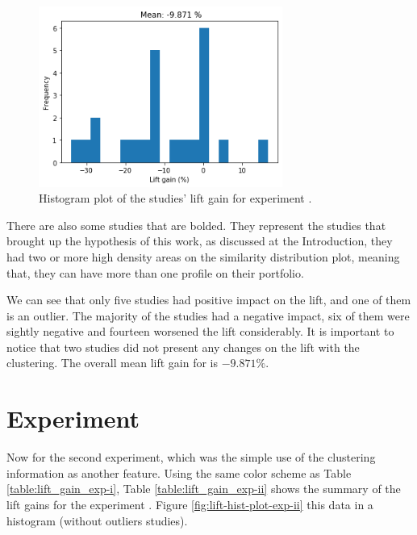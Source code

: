 \begin{figure}[!ht]
   \centering
   \includegraphics[width=8cm]{fig/ch4-lift-hist-plot-exp-i.png}
   \caption{Histogram plot of the studies' lift gain for experiment \nameExperimentI{}.}
   \label{fig:lift-hist-plot-exp-i}
\end{figure}

There are also some studies that are bolded. They represent the studies that brought up the hypothesis of this work, as discussed at the Introduction, they had two or more high density areas on the similarity distribution plot, meaning that, they can have more than one profile on their portfolio.

We can see that only five studies had positive impact on the lift, and one of them is an outlier. The majority of the studies had a negative impact, six of them were sightly negative and fourteen worsened the lift considerably. It is important to notice that two studies did not present any changes on the lift with the clustering. The overall mean lift gain for \nameExperimentI{} is $-9.871 \%$.


\section{Experiment \fullNameExperimentII{}}

Now for the second experiment, which was the simple use of the clustering information as another feature. Using the same color scheme as Table \ref{table:lift_gain_exp-i}, Table \ref{table:lift_gain_exp-ii} shows the summary of the lift gains for the experiment \nameExperimentII{}. Figure \ref{fig:lift-hist-plot-exp-ii} this data in a histogram (without outliers studies).

